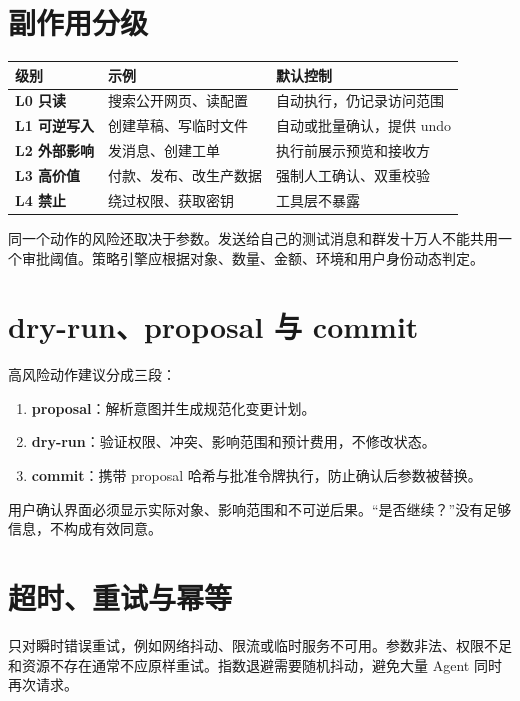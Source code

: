 \section{副作用分级}

\begin{table}[htbp]
\centering
\small
\begin{tabularx}{\textwidth}{>{\bfseries}p{} p{} X}
\toprule
级别 & 示例 & 默认控制 \\
\midrule
L0 只读 & 搜索公开网页、读配置 & 自动执行，仍记录访问范围 \\
L1 可逆写入 & 创建草稿、写临时文件 & 自动或批量确认，提供 undo \\
L2 外部影响 & 发消息、创建工单 & 执行前展示预览和接收方 \\
L3 高价值 & 付款、发布、改生产数据 & 强制人工确认、双重校验 \\
L4 禁止 & 绕过权限、获取密钥 & 工具层不暴露 \\
\bottomrule
\end{tabularx}
\end{table}

同一个动作的风险还取决于参数。发送给自己的测试消息和群发十万人不能共用一个审批阈值。策略引擎应根据对象、数量、金额、环境和用户身份动态判定。

\section{dry-run、proposal 与 commit}

高风险动作建议分成三段：

\begin{enumerate}
  \item \textbf{proposal}：解析意图并生成规范化变更计划。
  \item \textbf{dry-run}：验证权限、冲突、影响范围和预计费用，不修改状态。
  \item \textbf{commit}：携带 proposal 哈希与批准令牌执行，防止确认后参数被替换。
\end{enumerate}

用户确认界面必须显示实际对象、影响范围和不可逆后果。“是否继续？”没有足够信息，不构成有效同意。

\section{超时、重试与幂等}

只对瞬时错误重试，例如网络抖动、限流或临时服务不可用。参数非法、权限不足和资源不存在通常不应原样重试。指数退避需要随机抖动，避免大量 Agent 同时再次请求。

